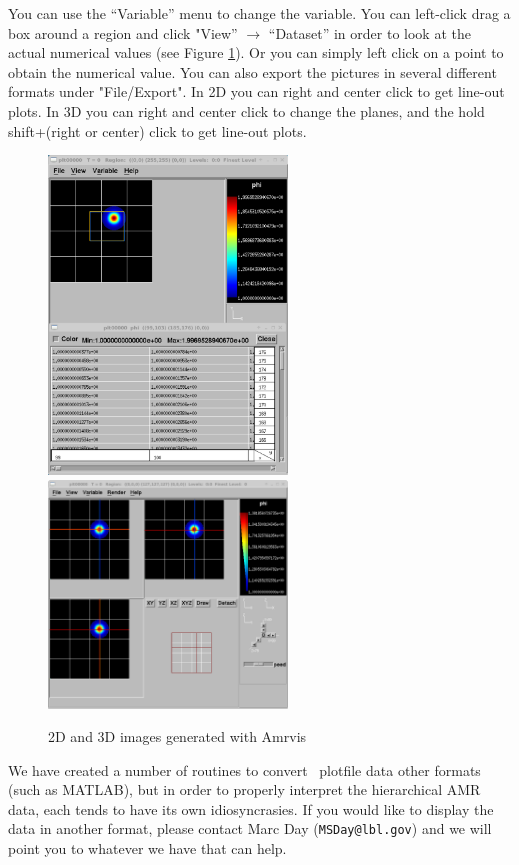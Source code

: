 \begin{enumerate}
  You can use the ``Variable'' menu to change the variable.
  You can left-click drag a box around a region
  and click "View'' $\rightarrow$ ``Dataset''
  in order to look at the actual numerical values
  (see Figure \ref{Fig:Amrvis}).
  Or you can simply left click on a point to obtain the numerical value.
  You can also export the
  pictures in several different formats under "File/Export".
  In 2D you can right and center click to get line-out plots.
  In 3D you can right and center click to change the planes, and the hold
  shift+(right or center) click to get line-out plots.

\begin{figure}[tb]
\centering
\includegraphics[width=2.5in]{./Visualization/Amrvis_2d}
~~~
\includegraphics[width=2.5in]{./Visualization/Amrvis_3d}
\caption{2D and 3D images generated with Amrvis}
\label{Fig:Amrvis}
\end{figure}

  We have created a number of routines to convert \amrex\ plotfile data
  other formats (such as MATLAB), but in order to properly interpret 
  the hierarchical AMR data, each tends to have its own idiosyncrasies.
  If you would like to display the data in another format, please contact
  Marc Day ({\tt MSDay@lbl.gov}) and we will point you to whatever we have
  that can help.

\end{enumerate}

